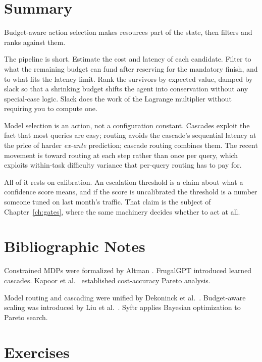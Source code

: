 \section{Summary}

Budget-aware action selection makes resources part of the state, then filters and
ranks against them.

The pipeline is short. Estimate the cost and latency of each candidate. Filter to
what the remaining budget can fund after reserving for the mandatory finish, and
to what fits the latency limit. Rank the survivors by expected value, damped by
slack so that a shrinking budget shifts the agent into conservation without any
special-case logic. Slack does the work of the Lagrange multiplier without
requiring you to compute one.

Model selection is an action, not a configuration constant. Cascades exploit the
fact that most queries are easy; routing avoids the cascade's sequential latency
at the price of harder \emph{ex-ante} prediction; cascade routing combines them.
The recent movement is toward routing at each step rather than once per query,
which exploits within-task difficulty variance that per-query routing has to pay
for.

All of it rests on calibration. An escalation threshold is a claim about what a
confidence score means, and if the score is uncalibrated the threshold is a
number someone tuned on last month's traffic. That claim is the subject of
Chapter~\ref{ch:gates}, where the same machinery decides whether to act at all.

\section*{Bibliographic Notes}

Constrained MDPs were formalized by Altman \cite{altman1999constrained}. FrugalGPT \cite{chen2023frugalgpt} introduced learned cascades. Kapoor et al.\ \cite{kapoor2024agents} established cost-accuracy Pareto analysis.

Model routing and cascading were unified by Dekoninck et al.\ \cite{dekoninck2025cascade}. Budget-aware scaling was introduced by Liu et al.\ \cite{liu2025bats}. Syftr \cite{dey2025syftr} applies Bayesian optimization to Pareto search.

\section*{Exercises}


